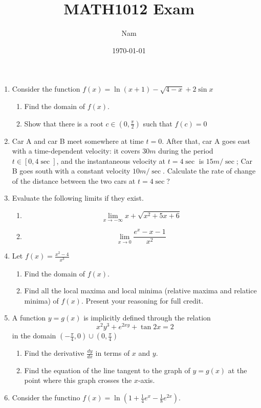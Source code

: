 \documentclass{report}
\title{MATH1012 Exam}
\author{Nam}
\date{\today}
\begin{document}
\begin{enumerate}
    \item Consider the function $f(x) = \ln(x+1) - \sqrt{4-x} + 2\sin x$
    \begin{enumerate}
        \item Find the domain of $f(x)$.
        \item Show that there is a root $c \in (0,\frac{\pi}{2})$ such that $f(c) = 0$
    \end{enumerate}
    \item Car A and car B meet somewhere at time $t = 0$. After that, car A goes east with a time-dependent velocity: it covers $30m$ during the period $t \in [0,4\sec]$, and the instantaneous velocity at $t=4 \sec$ is $15m/\sec$; Car B goes south with a constant velocity $10m/\sec$. Calculate the rate of change of the distance between the two cars at $t = 4\sec$?
    \item Evaluate the following limits if they exist.
    \begin{enumerate}
        \item  \[\lim_{x \to -\infty}  x + \sqrt{x^{2}+5x +6}\]
        \item \[\lim_{x \to 0}  \frac{e^{x} - x -1}{x^{2}}\]
    \end{enumerate}
    \item Let $f(x) = \frac{x^{2}-4}{x^{3}}$
    \begin{enumerate}
        \item Find the domain of $f(x)$.
        \item Find all the local maxima and local minima (relative maxima and relatice minima) of $f(x)$. Present your reasoning for full credit.
    \end{enumerate}
    \item A function $y=g(x)$ is implicitly defined through the relation \[x^{2}y^{3} + e^{2xy}+\tan 2x = 2\] in the domain $(-\frac{\pi}{4},0)\cup  (0,\frac{\pi}{4})$
    \begin{enumerate}
        \item Find the derivative $\frac{dy}{d x} $ in terms of $x$ and $y$.
        \item Find the equation of the line tangent to the graph of $y = g(x)$ at the point where this graph crosses the $x$-axis.
    \end{enumerate}
    \item Consider the functino $f(x) = \ln (1+\frac{1}{4}e^{x} - \frac{1}{8}e^{2x})$.
    \begin{enumerate}

\end{enumerate}
\end{enumerate}
\end{document}
